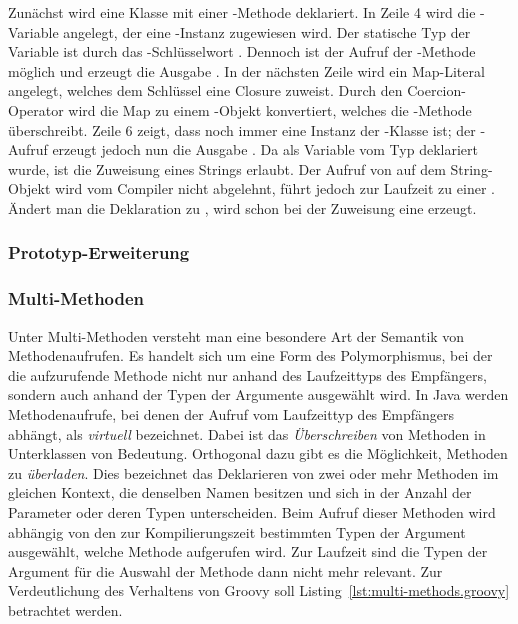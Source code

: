 
Zunächst wird eine Klasse  mit einer -Methode deklariert.
In Zeile 4 wird die -Variable angelegt, der eine -Instanz zugewiesen wird.
Der statische Typ der Variable ist durch das -Schlüsselwort .
Dennoch ist der Aufruf der -Methode möglich und erzeugt die Ausgabe .
In der nächsten Zeile wird ein Map-Literal angelegt, welches dem Schlüssel  eine Closure zuweist.
Durch den Coercion-Operator  wird die Map zu einem -Objekt konvertiert, welches die -Methode überschreibt.
Zeile 6 zeigt, dass  noch immer eine Instanz der -Klasse ist; der -Aufruf erzeugt jedoch nun die Ausgabe .
Da  als Variable vom Typ  deklariert wurde, ist die Zuweisung eines Strings erlaubt.
Der Aufruf von  auf dem String-Objekt wird vom Compiler nicht abgelehnt, führt jedoch zur Laufzeit zu einer .
Ändert man die Deklaration zu , wird schon bei der Zuweisung eine  erzeugt.

\subsubsection{Prototyp-Erweiterung}


\subsubsection{Multi-Methoden}

Unter Multi-Methoden versteht man eine besondere Art der Semantik von Methodenaufrufen.
Es handelt sich um eine Form des Polymorphismus, bei der die aufzurufende Methode nicht nur anhand des Laufzeittyps des Empfängers, sondern auch anhand der Typen der Argumente ausgewählt wird.
In Java werden Methodenaufrufe, bei denen der Aufruf vom Laufzeittyp des Empfängers abhängt, als \emph{virtuell} bezeichnet.
Dabei ist das \emph{Überschreiben} von Methoden in Unterklassen von Bedeutung.
Orthogonal dazu gibt es die Möglichkeit, Methoden zu \emph{überladen}.
Dies bezeichnet das Deklarieren von zwei oder mehr Methoden im gleichen Kontext, die denselben Namen besitzen und sich in der Anzahl der Parameter oder deren Typen unterscheiden.
Beim Aufruf dieser Methoden wird abhängig von den zur Kompilierungszeit bestimmten Typen der Argument ausgewählt, welche Methode aufgerufen wird.
Zur Laufzeit sind die Typen der Argument für die Auswahl der Methode dann nicht mehr relevant.
Zur Verdeutlichung des Verhaltens von Groovy soll Listing~\ref{lst:multi-methods.groovy} betrachtet werden.

